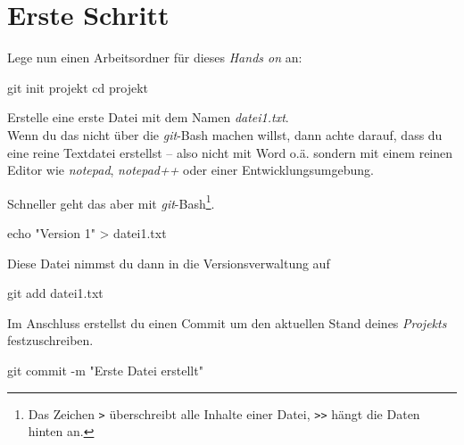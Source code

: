 \documentclass[
  letterpaper,
  DIV=11]{scrreprt}
\newenvironment{Shaded}{\begin{snugshade}}{\end{snugshade}}
\newcommand{\AttributeTok}[1]{\textcolor[rgb]{0.40,0.45,0.13}{#1}}
\newcommand{\BuiltInTok}[1]{\textcolor[rgb]{0.00,0.23,0.31}{#1}}
\newcommand{\FunctionTok}[1]{\textcolor[rgb]{0.28,0.35,0.67}{#1}}
\newcommand{\NormalTok}[1]{\textcolor[rgb]{0.00,0.23,0.31}{#1}}
\newcommand{\OperatorTok}[1]{\textcolor[rgb]{0.37,0.37,0.37}{#1}}
\newcommand{\StringTok}[1]{\textcolor[rgb]{0.13,0.47,0.30}{#1}}
\newcommand{\git}{\textit{git}\xspace}
\newcommand{\datei}[1]{\textit{#1}\xspace}
\begin{document}
\section{Erste Schritt}\label{erste-schritt}

Lege nun einen Arbeitsordner für dieses \emph{Hands on} an:

\begin{Shaded}
\begin{Highlighting}[]
\FunctionTok{git}\NormalTok{ init projekt }
\BuiltInTok{cd}\NormalTok{ projekt }
\end{Highlighting}
\end{Shaded}

Erstelle eine erste Datei mit dem Namen \datei{datei1.txt}.\\
Wenn du das nicht über die \git-Bash machen willst, dann achte darauf,
dass du eine reine Textdatei erstellst -- also nicht mit Word o.ä.
sondern mit einem reinen Editor wie \emph{notepad}, \emph{notepad++}
oder einer Entwicklungsumgebung.

Schneller geht das aber mit \git-Bash\footnote{Das Zeichen
  \texttt{\textgreater{}} überschreibt alle Inhalte einer Datei,
  \texttt{\textgreater{}\textgreater{}} hängt die Daten hinten an.}.

\begin{Shaded}
\begin{Highlighting}[]
\BuiltInTok{echo} \StringTok{"Version 1"} \OperatorTok{\textgreater{}}\NormalTok{ datei1.txt }
\end{Highlighting}
\end{Shaded}

Diese Datei nimmst du dann in die Versionsverwaltung auf

\begin{Shaded}
\begin{Highlighting}[]
\FunctionTok{git}\NormalTok{ add datei1.txt }
\end{Highlighting}
\end{Shaded}

Im Anschluss erstellst du einen Commit um den aktuellen Stand deines
\emph{Projekts} festzuschreiben.

\begin{Shaded}
\begin{Highlighting}[]
\FunctionTok{git}\NormalTok{ commit }\AttributeTok{{-}m} \StringTok{"Erste Datei erstellt"}
\end{Highlighting}
\end{Shaded}
\end{document}
